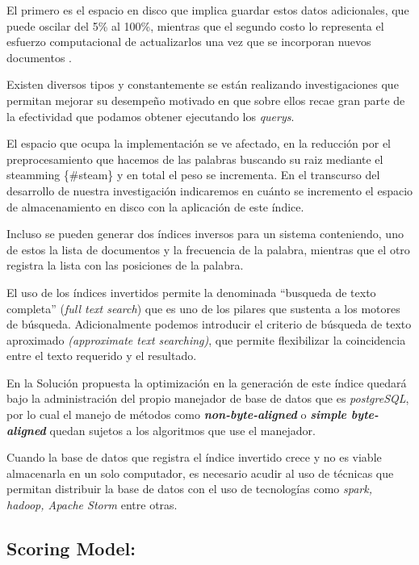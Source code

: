 \documentclass[
  10,
  openany]{book}
\begin{document}
El primero es el espacio en disco que implica guardar estos datos adicionales, que puede oscilar del 5\% al 100\%, mientras que el segundo costo lo representa el esfuerzo computacional de actualizarlos una vez que se incorporan nuevos documentos \citep{Mahapatra2011}.

Existen diversos tipos y constantemente se están realizando investigaciones que permitan mejorar su desempeño motivado en que sobre ellos recae gran parte de la efectividad que podamos obtener ejecutando los \emph{querys}.

El espacio que ocupa la implementación se ve afectado, en la reducción por el preprocesamiento que hacemos de las palabras buscando su raiz mediante el steamming \{\#steam\} y en total el peso se incrementa. En el transcurso del desarrollo de nuestra investigación indicaremos en cuánto se incremento el espacio de almacenamiento en disco con la aplicación de este índice.

Incluso se pueden generar dos índices inversos para un sistema conteniendo, uno de estos la lista de documentos y la frecuencia de la palabra, mientras que el otro registra la lista con las posiciones de la palabra.

El uso de los índices invertidos permite la denominada ``busqueda de texto completa'' (\emph{full text search}) que es uno de los pilares que sustenta a los motores de búsqueda. Adicionalmente podemos introducir el criterio de búsqueda de texto aproximado \emph{(approximate text searching)}, que permite flexibilizar la coincidencia entre el texto requerido y el resultado.

En la Solución propuesta la optimización en la generación de este índice quedará bajo la administración del propio manejador de base de datos que es \emph{postgreSQL}, por lo cual el manejo de métodos como \textbf{\emph{non-byte-aligned}} o \textbf{\emph{simple byte-aligned}} quedan sujetos a los algoritmos que use el manejador.

Cuando la base de datos que registra el índice invertido crece y no es viable almacenarla en un solo computador, es necesario acudir al uso de técnicas que permitan distribuir la base de datos con el uso de tecnologías como \emph{spark, hadoop, Apache Storm} entre otras.

\hypertarget{rank}{%
\subsection{Scoring Model:}\label{rank}}
\end{document}
